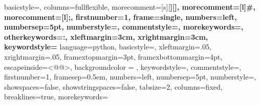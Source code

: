 		{
			basicstyle=\ttfamily\small,
			columns=fullflexible,
			morecomment=[s][\color{Orchid}\bfseries]{[}{]},
			morecomment=[l]{\#},
			morecomment=[l]{;},
			firstnumber=1,                	%
			frame=single,	                	%
			numbers=left,                   %
			numbersep=5pt,                  %
			numberstyle=\tiny\color{gray},	%
			commentstyle=\color{gray}\ttfamily,
			morekeywords={},
			otherkeywords={:},
			xleftmargin=3cm,
			xrightmargin=3cm,
			keywordstyle={\color{blue}\bfseries}
		}
	{
		language=python,
		basicstyle=\ttm, %
		xleftmargin=.05\textwidth,
		xrightmargin=.05\textwidth,
		framextopmargin=3pt,
		framexbottommargin=4pt, 
		escapeinside={<@}{@>},
		backgroundcolor = \color{light-gray}, %
		keywordstyle=\color{vbablue},   %
		commentstyle=\color{gray}\ttfamily,  %
		firstnumber=1,                	%
		framesep=0.5em,
		numbers=left,                   %
		numbersep=5pt,                  %
		numberstyle=\tiny\color{gray},	%
		showspaces=false,               %
		showstringspaces=false,         %
		tabsize=2,		                %
		columns=fixed,					%
		breaklines=true,				%
		morekeywords={}%
	}

